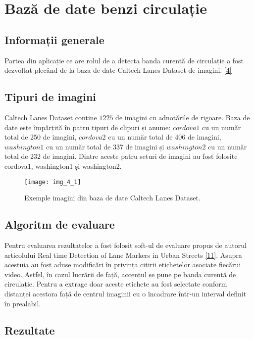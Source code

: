 \section{Bază de date benzi circulație}
\subsection*{Informații generale}

Partea din aplicație ce are rolul de a detecta banda curentă de circulație a fost dezvoltat plecând de la baza de date Caltech Lanes Dataset de imagini.  \hyperlink{Bazadedatebenzidecirculatie}{[4]}

\subsection*{Tipuri de imagini}

Caltech Lanes Dataset conține $1225$ de imagini cu adnotările de rigoare. Baza de date este împărțită în patru tipuri de clipuri și anume: $cordova1$ cu un număr total de 250 de imagini, $cordova2$ cu un număr total de 406 de imagini, $washington1$ cu un număr total de 337 de imagini și $washington2$ cu un număr total de 232 de imagini. Dintre aceste patru seturi de imagini au fost folosite cordova1, washington1 și washington2.

\begin{figure}[!h]
	\centering
	\texttt{[image: img\_4\_1]}
	\caption[Imagini Caltech Lanes Dataset]{Exemple imagini din baza de date Caltech Lanes Dataset.}
\end{figure} 

\subsection*{Algoritm de evaluare}

Pentru evaluarea rezultatelor a fost folosit soft-ul de evaluare propus de autorul articolului Real time Detection of Lane Markers in Urban Streets \hyperlink{MohamedAly}{[11]}. 
Asupra acestuia au fost aduse modificări în privința citirii etichetelor asociate fiecărui video. Astfel, în cazul lucrării de față, accentul se pune pe banda curentă de circulație. Pentru a extrage doar aceste etichete au fost selectate conform distanței acestora față de centrul imaginii cu o încadrare într-un interval definit în prealabil.

\subsection*{Rezultate}

